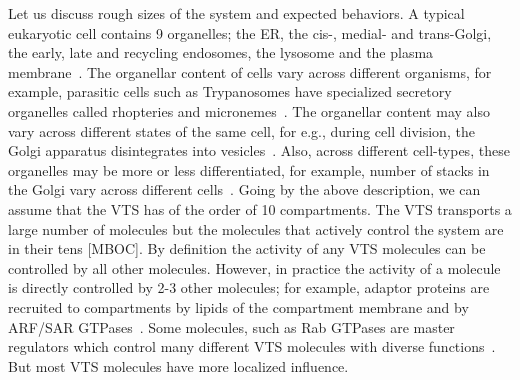Let us discuss rough sizes of the system and expected behaviors.
A typical eukaryotic cell contains 9 organelles; the ER, the cis-, medial- and trans-Golgi, the early, late and recycling endosomes, the lysosome and the plasma membrane~\cite{lodish2008molecular}. 
%
The organellar content of cells vary across different organisms, for example, parasitic cells such as Trypanosomes have specialized secretory organelles called rhopteries and micronemes~\cite{gubbels2012evolution}. 
%
The organellar content may also vary across different states of the same cell, for e.g., during cell division, the Golgi apparatus disintegrates into vesicles~\cite{tang2013cell}. 
%
Also, across different cell-types, these organelles may be more or less differentiated, for example, number of stacks in the Golgi vary across different cells~\cite{polishchuk2004structural}. 
%
Going by the above description, we can assume that the VTS has of the order of 10 compartments. 
%
The VTS transports a large number of molecules but the molecules that actively control the system are in their tens [MBOC]. 
%
By definition the activity of any VTS molecules can be controlled by all other molecules.
%
However, in practice the activity of a molecule is directly controlled by 2-3 other molecules; for example, adaptor proteins are recruited to compartments by lipids of the compartment membrane and by ARF/SAR GTPases~\cite{kahn2009toward}. 
%
Some molecules, such as Rab GTPases are master regulators which control many different VTS molecules with diverse functions~\cite{zerial2001rab}. 
%
But most VTS molecules have more localized influence.


